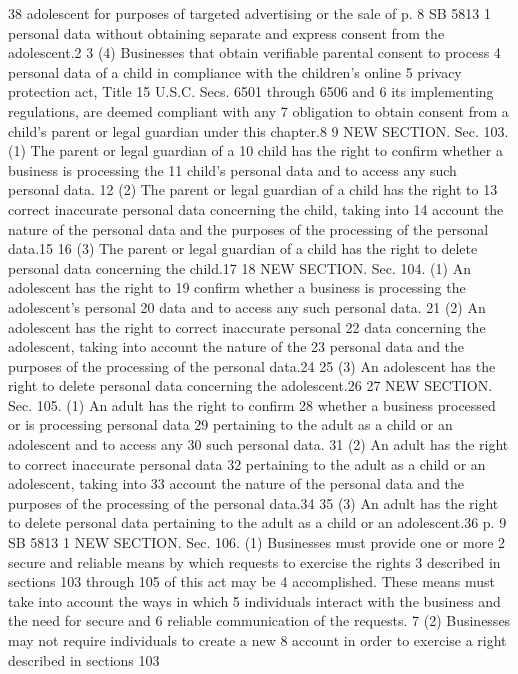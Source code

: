 38 adolescent for purposes of targeted advertising or the sale of
p. 8 SB 5813
1 personal data without obtaining separate and express consent from the
adolescent.2
3 (4) Businesses that obtain verifiable parental consent to process
4 personal data of a child in compliance with the children's online
5 privacy protection act, Title 15 U.S.C. Secs. 6501 through 6506 and
6 its implementing regulations, are deemed compliant with any
7 obligation to obtain consent from a child's parent or legal guardian
under this chapter.8
9 NEW SECTION. Sec. 103. (1) The parent or legal guardian of a
10 child has the right to confirm whether a business is processing the
11 child's personal data and to access any such personal data.
12 (2) The parent or legal guardian of a child has the right to
13 correct inaccurate personal data concerning the child, taking into
14 account the nature of the personal data and the purposes of the
processing of the personal data.15
16 (3) The parent or legal guardian of a child has the right to
delete personal data concerning the child.17
18 NEW SECTION. Sec. 104. (1) An adolescent has the right to
19 confirm whether a business is processing the adolescent's personal
20 data and to access any such personal data.
21 (2) An adolescent has the right to correct inaccurate personal
22 data concerning the adolescent, taking into account the nature of the
23 personal data and the purposes of the processing of the personal
data.24
25 (3) An adolescent has the right to delete personal data
concerning the adolescent.26
27 NEW SECTION. Sec. 105. (1) An adult has the right to confirm
28 whether a business processed or is processing personal data
29 pertaining to the adult as a child or an adolescent and to access any
30 such personal data.
31 (2) An adult has the right to correct inaccurate personal data
32 pertaining to the adult as a child or an adolescent, taking into
33 account the nature of the personal data and the purposes of the
processing of the personal data.34
35 (3) An adult has the right to delete personal data pertaining to
the adult as a child or an adolescent.36
p. 9 SB 5813
1 NEW SECTION. Sec. 106. (1) Businesses must provide one or more
2 secure and reliable means by which requests to exercise the rights
3 described in sections 103 through 105 of this act may be
4 accomplished. These means must take into account the ways in which
5 individuals interact with the business and the need for secure and
6 reliable communication of the requests.
7 (2) Businesses may not require individuals to create a new
8 account in order to exercise a right described in sections 103
